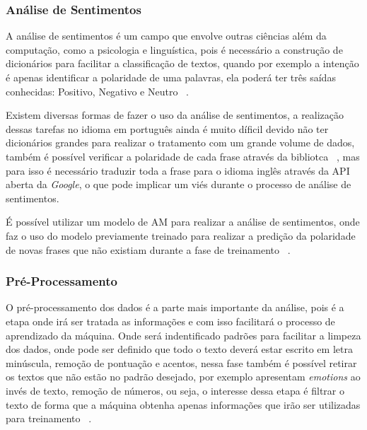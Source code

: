           \subsubsection{Análise de Sentimentos}

          A análise de sentimentos é um campo que envolve outras ciências além da computação, como a psicologia e linguística, pois é necessário 
          a construção de dicionários para facilitar a classificação de textos, quando por exemplo a intenção é apenas identificar a polaridade
          de uma palavras, ela poderá ter três saídas conhecidas: Positivo, Negativo e Neutro ~\cite{wegrzyn2012tweets}. 
          
          Existem diversas formas de fazer o uso da análise de sentimentos, a realização dessas tarefas no idioma em português ainda é muito díficil devido 
          não ter dicionários grandes para realizar o tratamento com um grande volume de dados, também é possível verificar a polaridade de cada frase através
          da bibliotca ~\cite{textblob}, mas para isso é necessário traduzir toda a frase para o idioma inglês através da \acrshort{API} aberta da \textit{Google},
          o que pode implicar um viés durante o processo de análise de sentimentos.
          
          É possível utilizar um modelo de \acrshort{AM} para realizar a análise de sentimentos, onde faz o uso do modelo previamente treinado para realizar a predição
          da polaridade de novas frases que não existiam durante a fase de treinamento ~\cite{golbeck2010twitter}.
          
          
        \subsubsection{Pré-Processamento}

            O pré-processamento dos dados é a parte mais importante da análise, pois é a etapa onde irá ser tratada as informações e com isso 
          facilitará o processo de aprendizado da máquina. Onde será indentificado padrões para facilitar a limpeza dos dados, onde pode ser definido
          que todo o texto deverá estar escrito em letra minúscula, remoção de pontuação e acentos, nessa fase também é possível retirar os textos que não 
          estão no padrão desejado, por exemplo apresentam \textit{emotions} ao invés de texto, remoção de números, ou seja, o interesse dessa etapa é 
          filtrar o texto de forma que a máquina obtenha apenas informações que irão ser utilizadas para treinamento ~\cite{ferreirametodo}.

